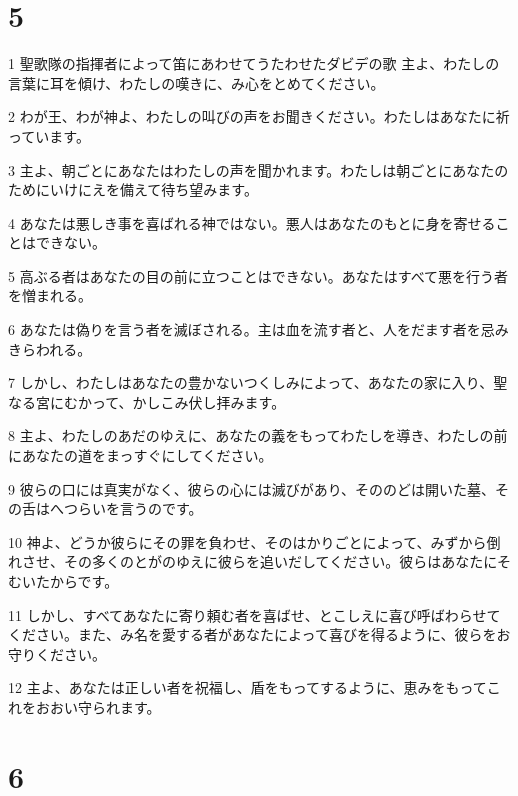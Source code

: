 \chapter{5}

\par 1 聖歌隊の指揮者によって笛にあわせてうたわせたダビデの歌 主よ、わたしの言葉に耳を傾け、わたしの嘆きに、み心をとめてください。
\par 2 わが王、わが神よ、わたしの叫びの声をお聞きください。わたしはあなたに祈っています。
\par 3 主よ、朝ごとにあなたはわたしの声を聞かれます。わたしは朝ごとにあなたのためにいけにえを備えて待ち望みます。
\par 4 あなたは悪しき事を喜ばれる神ではない。悪人はあなたのもとに身を寄せることはできない。
\par 5 高ぶる者はあなたの目の前に立つことはできない。あなたはすべて悪を行う者を憎まれる。
\par 6 あなたは偽りを言う者を滅ぼされる。主は血を流す者と、人をだます者を忌みきらわれる。
\par 7 しかし、わたしはあなたの豊かないつくしみによって、あなたの家に入り、聖なる宮にむかって、かしこみ伏し拝みます。
\par 8 主よ、わたしのあだのゆえに、あなたの義をもってわたしを導き、わたしの前にあなたの道をまっすぐにしてください。
\par 9 彼らの口には真実がなく、彼らの心には滅びがあり、そののどは開いた墓、その舌はへつらいを言うのです。
\par 10 神よ、どうか彼らにその罪を負わせ、そのはかりごとによって、みずから倒れさせ、その多くのとがのゆえに彼らを追いだしてください。彼らはあなたにそむいたからです。
\par 11 しかし、すべてあなたに寄り頼む者を喜ばせ、とこしえに喜び呼ばわらせてください。また、み名を愛する者があなたによって喜びを得るように、彼らをお守りください。
\par 12 主よ、あなたは正しい者を祝福し、盾をもってするように、恵みをもってこれをおおい守られます。

\chapter{6}

